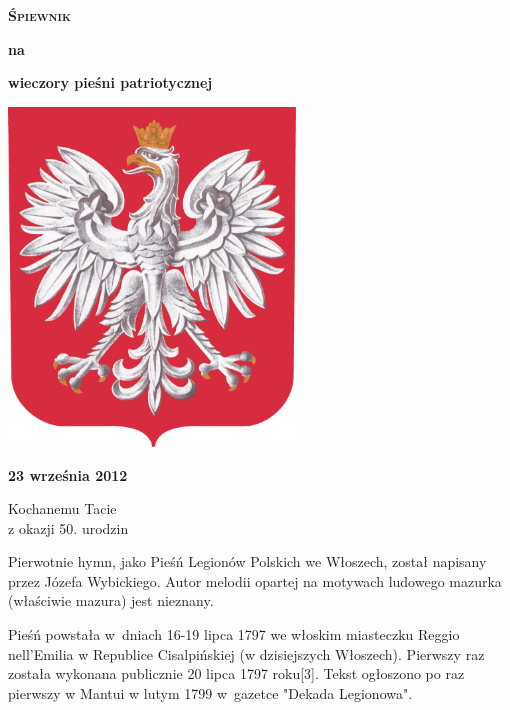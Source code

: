 \documentclass[a4paper,twoside,noinfo,nofrontmatter]{songbook}
\begin{document}
\begin{front}
\begin{titlepage}
\begin{center}
  {\VERYHUGE \bfseries\textsc{Śpiewnik}}

  \vspace{0.2in}
  {\Huge\bfseries na}
  \vspace{0.2in}
  
  {\HUGE\bfseries wieczory pieśni patriotycznej}
\end{center}
\vspace{0.5in}
\begin{center}
  \includegraphics[width=3in]{img/godlo-small.png}
\end{center}
\vspace{0.55in}
\begin{center}
  {\Huge\bfseries 23 września 2012}
\end{center}
\end{titlepage}

\begin{dedication}
  Kochanemu Tacie\\
  z okazji 50. urodzin
\end{dedication}
\end{front}


\begin{info}
    Pierwotnie hymn, jako Pieśń Legionów Polskich we Włoszech, został
    napisany przez Józefa Wybickiego. Autor melodii opartej na motywach
    ludowego mazurka (właściwie mazura) jest nieznany.

    Pieśń powstała w~dniach 16-19 lipca 1797 we włoskim miasteczku
    Reggio nell'Emilia w Republice Cisalpińskiej (w dzisiejszych
    Włoszech). Pierwszy raz została wykonana publicznie 20 lipca 1797
    roku[3]. Tekst ogłoszono po raz pierwszy w Mantui w lutym 1799
    w~gazetce "Dekada Legionowa".
\end{info}
\end{document}
